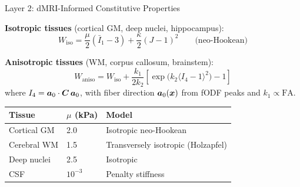 \begin{frame}{Layer 2: dMRI-Informed Constitutive Properties}

  \textbf{Isotropic tissues} (cortical GM, deep nuclei, hippocampus):
  \[
    W_{\text{iso}} = \frac{\mu}{2}(\bar{I}_1 - 3)
      + \frac{\kappa}{2}(J - 1)^2
    \qquad \text{(neo-Hookean)}
  \]

  \textbf{Anisotropic tissues} (WM, corpus callosum, brainstem):
  \[
    W_{\text{aniso}} = W_{\text{iso}}
      + \frac{k_1}{2k_2}\left[
        \exp\!\bigl(k_2 \langle I_4 - 1 \rangle^2\bigr) - 1
      \right]
  \]
  where $I_4 = \bm{a}_0 \cdot \bm{C}\, \bm{a}_0$, with fiber direction
  $\bm{a}_0(\bm{x})$ from fODF peaks and $k_1 \propto \text{FA}$.

  \bigskip

  \begin{tabular}{lll}
    \toprule
    \textbf{Tissue} & $\mu$ (kPa) & \textbf{Model} \\
    \midrule
    Cortical GM  & 2.0 & Isotropic neo-Hookean \\
    Cerebral WM  & 1.5 & Transversely isotropic (Holzapfel) \\
    Deep nuclei  & 2.5 & Isotropic \\
    CSF          & $10^{-3}$ & Penalty stiffness \\
    \bottomrule
  \end{tabular}

\end{frame}

